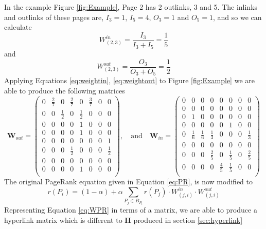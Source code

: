 \documentclass[11pt]{report}
\begin{document}
In the example Figure \ref{fig:Example}, Page 2 has 2 outlinks, 3 and 5. The inlinks and outlinks of these pages are, $I_3 = 1$, $I_5 = 4$, $O_3 = 1$ and $O_5 = 1$, and so we can calculate 
\[W^{in}_{(2,3)} = \frac{I_3}{I_3 + I_5} = \frac{1}{5} \]
and 
\[W^{out}_{(2,3)} = \frac{O_3}{O_3 + O_5} = \frac{1}{2} \] 
Applying Equations \eqref{eq:weightin}, \eqref{eq:weightout} to Figure \ref{fig:Example} we are able to produce the following matrices
\[\textbf{W}_{out}=\left(
\begin{array}{cccccccc}
0 & \frac{2}{7} & 0 & \frac{2}{7} & 0 &\frac{3}{7} & 0 & 0 \\
0 & 0 &\frac{1}{2}& 0 &\frac{1}{2}& 0 & 0 & 0\\
0 & 0 & 0 & 0 & 1 & 0 & 0 & 0\\
0 & 0 & 0 & 0 & 1 & 0 & 0 & 0\\
0 & 0 & 0 & 0 & 0 & 0 & 0 & 1\\
0 & 0 & 0 & \frac{1}{2} & 0 & 0 & 0 & \frac{1}{2} \\
0 & 0 & 0 & 0 & 0 & 0 & 0 & 0\\
0 & 0 & 0 & 0 & 1 & 0 & 0 & 0\\
\end{array}
\right) \mathrm{,}\quad\mathrm{and}\quad\textbf{W}_{in}=\left(
\begin{array}{cccccccc}
0 & 0 & 0 & 0 & 0 & 0 & 0 & 0 \\
0 & 0 & 0 & 0 & 0 & 0 & 0 & 0\\
0 & 1 & 0 & 0 & 0 & 0 & 0 & 0\\
0 & 0 & 0 & 0 & 0 & 1 & 0 & 0\\
0 & \frac{1}{6} & \frac{1}{6} & \frac{1}{3} & 0 & 0 & 0 & \frac{1}{3}\\
0 & 0 & 0 & 0 & 0 & 0 & 0 & 0 \\
0 & 0 & 0 & \frac{2}{5} & 0 & \frac{1}{5} & 0 & \frac{2}{5}\\
0 & 0 & 0 & 0 & \frac{4}{5} & \frac{1}{5} & 0 & 0\\
\end{array}
\right)	\]
The original PageRank equation given in Equation \eqref{eq:PR}, is now modified to 
\begin{equation} \label{eq:WPR}
r(P_i) = (1-\alpha) + \alpha \displaystyle \sum_{P_j\in B_{P_i }} r(P_j) \cdot W^{in}_{(j,i)} \cdot W^{out}_{(j,i)}
\end{equation}
Representing Equation \eqref{eq:WPR} in terms of a matrix, we are able to produce a hyperlink matrix which is different to \textbf{H} produced in section \ref{sec:hyperlink}
\end{document}

